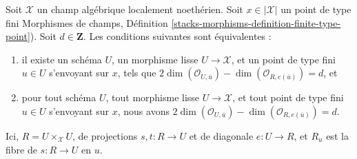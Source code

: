 \begin{lemma}
\label{lemma-dimension-local-ring}
Soit $\mathcal{X}$ un champ algébrique localement noethérien.
Soit $x \in |\mathcal{X}|$ un point de type fini 
Morphismes de champs, Définition
\ref{stacks-morphisms-definition-finite-type-point}).
Soit $d \in \mathbf{Z}$.
Les conditions suivantes sont équivalentes :
\begin{enumerate}
\item il existe un schéma $U$, un morphisme lisse $U \to \mathcal{X}$,
et un point de type fini $u \in U$ s'envoyant sur $x$, tels que
$2\dim(\mathcal{O}_{U, \overline{u}}) -
\dim(\mathcal{O}_{R, e(\overline{u})}) = d$, et
\item pour tout schéma $U$, tout morphisme lisse $U \to \mathcal{X}$,
et tout point de type fini $u \in U$ s'envoyant sur $x$, nous avons
$2\dim(\mathcal{O}_{U, \overline{u}}) -
\dim(\mathcal{O}_{R, e(\overline{u})}) = d$.
\end{enumerate}
Ici, $R = U \times_\mathcal{X} U$, de projections $s, t : R \to U$ et de
diagonale $e : U \to R$, et $R_u$ est la fibre de $s : R \to U$ en $u$.
\end{lemma}

